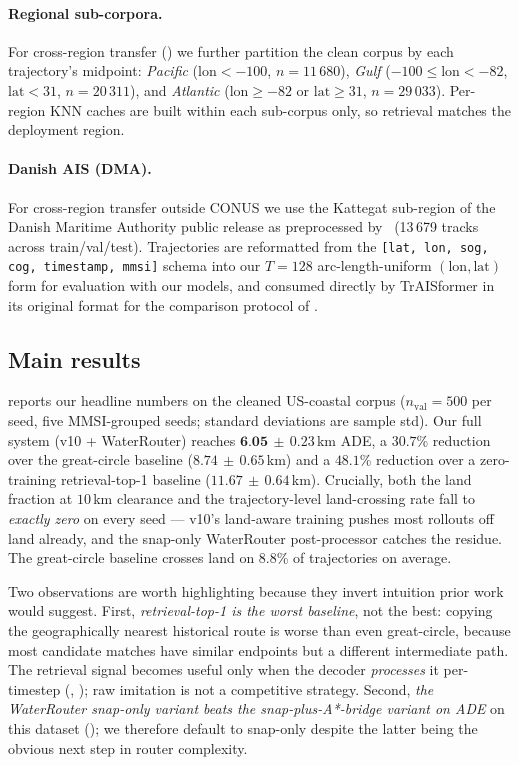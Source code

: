 \documentclass[11pt]{article}
\begin{document}
\paragraph{Regional sub-corpora.} For cross-region transfer
() we further partition the clean corpus by each
trajectory's midpoint:
\textit{Pacific} ($\mathrm{lon} < -100$, $n = 11\,680$),
\textit{Gulf} ($-100 \le \mathrm{lon} < -82$, $\mathrm{lat} < 31$, $n = 20\,311$), and
\textit{Atlantic} ($\mathrm{lon} \ge -82$ or $\mathrm{lat} \ge 31$, $n = 29\,033$).
Per-region KNN caches are built within each sub-corpus only, so retrieval
matches the deployment region.

\paragraph{Danish AIS (DMA).} For cross-region transfer outside CONUS we
use the Kattegat sub-region of the Danish Maritime Authority public
release as preprocessed by~\citep{traisformer2024} (13\,679 tracks across
train/val/test). Trajectories are reformatted from the
\texttt{[lat, lon, sog, cog, timestamp, mmsi]} schema into our
$T=128$ arc-length-uniform $(\mathrm{lon}, \mathrm{lat})$ form for evaluation
with our models, and consumed directly by TrAISformer in its original
format for the comparison protocol of .

\subsection{Main results}
\label{sec:main_results}

 reports our headline numbers on the cleaned US-coastal
corpus ($n_{\text{val}}=500$ per seed, five MMSI-grouped seeds; standard
deviations are sample std). Our full system (v10 + WaterRouter) reaches
$\textbf{6.05}\,\pm\,0.23$\,km ADE, a $30.7$\% reduction over the
great-circle baseline ($8.74\,\pm\,0.65$\,km) and a $48.1$\% reduction
over a zero-training retrieval-top-1 baseline ($11.67\,\pm\,0.64$\,km).
Crucially, both the land fraction at $10$\,km clearance and the
trajectory-level land-crossing rate fall to \emph{exactly zero} on every
seed --- v10's land-aware training pushes most rollouts off land
already, and the snap-only WaterRouter post-processor catches the
residue. The great-circle baseline crosses land on $8.8$\% of
trajectories on average.

Two observations are worth highlighting because they invert intuition
prior work would suggest. First, \emph{retrieval-top-1 is the worst
baseline}, not the best: copying the geographically nearest historical
route is worse than even great-circle, because most candidate matches
have similar endpoints but a different intermediate path. The retrieval
signal becomes useful only when the decoder \emph{processes} it
per-timestep (, ); raw imitation is
not a competitive strategy. Second, \emph{the WaterRouter snap-only
variant beats the snap-plus-A*-bridge variant on ADE} on this dataset
(); we therefore default to snap-only despite
the latter being the obvious next step in router complexity.
\end{document}
